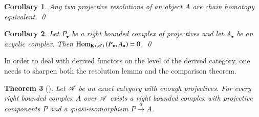 \documentclass[1p]{elsarticle}
\theoremstyle{mythm}
\newtheorem{Thm}{Theorem}[section]
\newtheorem{Cor}[Thm]{Corollary}
\theoremstyle{mydef}
\begin{document}

\begin{Cor}
  \label{cor:proj-res-htpy-equiv}
  Any two projective resolutions of
  an object $A$ are chain homotopy equivalent. \qed
\end{Cor}


\begin{Cor}
  \label{cor:no-mor-proj-cxes-to-ac-cxes}
  Let $P_{\bullet}$ be a right bounded complex of projectives and let
  $A_{\bullet}$ be an acyclic complex. Then
  $\operatorname{Hom}_{\operatorname{\mathbf{K}}{(\operatorname{\mathscr{A}})}}{(P_{\bullet},A_{\bullet})} = 0$. \qed
\end{Cor}

In order to deal with derived functors on the level of the derived
category, one needs to sharpen both the resolution lemma and the
comparison theorem.


\begin{Thm}[{\cite[4.1, Lemma, b)]{MR1052551}}]
  \label{thm:bounded-above-qi-cx-proj}
  Let $\operatorname{\mathscr{A}}$ be an exact category with enough projectives. For every
  right bounded complex $A$ over $\operatorname{\mathscr{A}}$ exists a right bounded
  complex with projective components $P$ and
  a quasi-isomorphism $P \xrightarrow{\alpha} A$.
\end{Thm}
\end{document}
